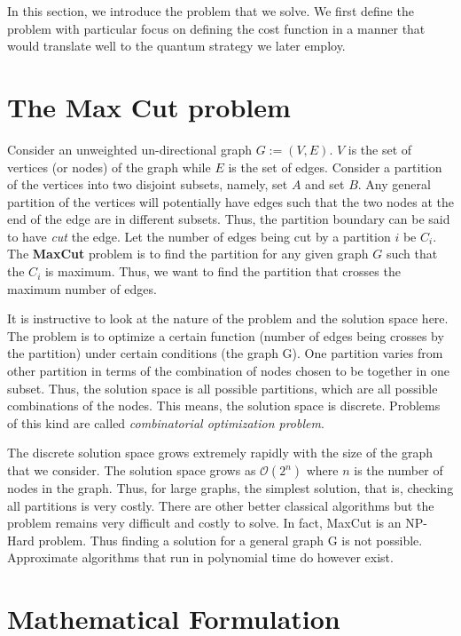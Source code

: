 In this section, we introduce the problem that we solve.
We first define the problem with particular focus on defining the cost function in a manner that would translate well to the quantum strategy we later employ.
\section{The Max Cut problem}
Consider an unweighted un-directional graph $G := (V, E)$. $V$ is the set of vertices (or nodes) of the graph while $E$ is the set of edges.
Consider a partition of the vertices into two disjoint subsets, namely, set $A$ and set $B$.
Any general partition of the vertices will potentially have edges such that the two nodes at the end of the edge are in different subsets.
Thus, the partition boundary can be said to have \textit{cut} the edge.
Let the number of edges being cut by a partition $i$ be $C_i$.
The \textbf{MaxCut} problem is to find the partition for any given graph $G$ such that the $C_i$ is maximum.
Thus, we want to find the partition that crosses the maximum number of edges.

It is instructive to look at the nature of the problem and the solution space here.
The problem is to optimize a certain function (number of edges being crosses by the partition) under certain conditions (the graph G).
One partition varies from other partition in terms of the combination of nodes chosen to be together in one subset.
Thus, the solution space is all possible partitions, which are all possible combinations of the nodes.
This means, the solution space is discrete.
Problems of this kind are called \textit{combinatorial optimization problem}.

The discrete solution space grows extremely rapidly with the size of the graph that we consider.
The solution space grows as $\mathcal{O}(2^n)$ where $n$ is the number of nodes in the graph.
Thus, for large graphs, the simplest solution, that is, checking all partitions is very costly.
There are other better classical algorithms but the problem remains very difficult and costly to solve.
In fact, MaxCut is an NP-Hard problem. Thus finding a solution for a general graph G is not possible.
Approximate algorithms that run in polynomial time do however exist.

\section{Mathematical Formulation}

